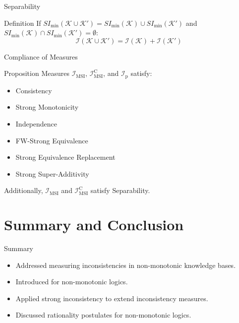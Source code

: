 \begin{frame}{Separability}
    \begin{block}{Definition}
        If $SI_{\min}(\mathcal{K} \cup \mathcal{K}') = SI_{\min}(\mathcal{K}) \cup SI_{\min}(\mathcal{K}')$ and $SI_{\min}(\mathcal{K}) \cap SI_{\min}(\mathcal{K}') = \emptyset$:
        \[
            \mathcal{I}(\mathcal{K} \cup \mathcal{K}') = \mathcal{I}(\mathcal{K}) + \mathcal{I}(\mathcal{K}')
        \]
    \end{block}
\end{frame}

\begin{frame}{Compliance of Measures}
    \begin{block}{Proposition}
        Measures $\mathcal{I}_{\text{MSI}}$, $\mathcal{I}_{\text{MSI}}^\text{C}$, and $\mathcal{I}_{\text{p}}$ satisfy:

        \begin{itemize}
            \item Consistency
            \item Strong Monotonicity
            \item Independence
            \item FW-Strong Equivalence
            \item Strong Equivalence Replacement
            \item Strong Super-Additivity
        \end{itemize}

        Additionally, $\mathcal{I}_{\text{MSI}}$ and $\mathcal{I}_{\text{MSI}}^\text{C}$ satisfy Separability.
    \end{block}
\end{frame}

\section{Summary and Conclusion}

\begin{frame}{Summary}
    \begin{itemize}
        \item Addressed measuring inconsistencies in non-monotonic knowledge bases.
        \item Introduced  for non-monotonic logics.
        \item Applied strong inconsistency to extend inconsistency measures.
        \item Discussed rationality postulates for non-monotonic logics.
    \end{itemize}
\end{frame}

